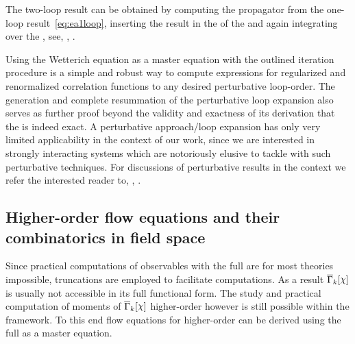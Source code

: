 The two-loop result can be obtained by computing the propagator from the one-loop result~\eqref{eq:ea1loop}, inserting the result in the \rhs{} of the \frgEquation{} and again integrating over the \rgscale{}, see, \eg{}, .

Using the Wetterich equation as a master equation with the outlined iteration procedure is a simple and robust way to compute expressions for regularized and renormalized \ipi{} correlation functions to any desired perturbative loop-order.
The generation and complete resummation of the perturbative loop expansion also serves as further proof \dash{} beyond the validity and exactness of its derivation \dash{} that the \frgEquation{} is indeed exact.
A perturbative approach/loop expansion has only very limited applicability in the context of our work, since we are interested in strongly interacting systems which are notoriously elusive to tackle with such perturbative techniques. 
For discussions of perturbative results in the \frg{} context we refer the interested reader to, \eg{}, .

\subsection{Higher-order flow equations and their combinatorics in field space}\label{subsec:higherOrderFlowEquations}
Since practical computations of observables with the full \frgEq{} are for most theories impossible, truncations are employed to facilitate computations.
As a result $\FSeaa_k[\FSsf]$ is usually not accessible in its full functional form. 
The study and practical computation of moments of $\FSeaa_k[\FSsf]$  \dash{} higher-order \nptFunctions{} \dash{} however is still possible within the \frg{} framework.
To this end flow equations for higher-order \nptFunctions{} can be derived using the full \frgEq{} as a master equation.

